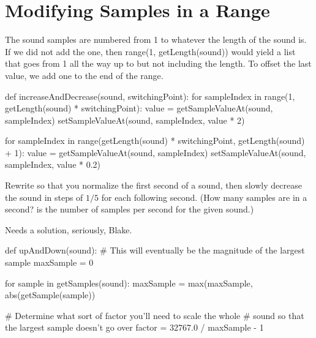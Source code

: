 
\chapter{Modifying Samples in a Range}

\begin{exercises}

\begin{ex}
The sound samples are numbered from 1 to whatever the length of the sound
is. If we did not add the one, then range(1, getLength(sound)) would yield
a list that goes from 1 all the way up to but not including the length. To
offset the last value, we add one to the end of the range.
\end{ex}

\begin{ex}
\begin{example}
def increaseAndDecrease(sound, switchingPoint):
    for sampleIndex in range(1, getLength(sound) * switchingPoint):
        value = getSampleValueAt(sound, sampleIndex)
        setSampleValueAt(sound, sampleIndex, value * 2)

    for sampleIndex in range(getLength(sound) * switchingPoint, getLength(sound) + 1):
        value = getSampleValueAt(sound, sampleIndex)
        setSampleValueAt(sound, sampleIndex, value * 0.2)
\end{example}
\end{ex}

\begin{ex}
Rewrite  so that you normalize the first second
of a sound, then slowly decrease the sound in steps of $1/5$ for
each following second.  (How many samples are in a second?
 is the number of samples per second for the
given sound.)

Needs a solution, seriously, Blake.
\end{ex}

\begin{ex}
\begin{example}
def upAndDown(sound):
    # This will eventually be the magnitude of the largest sample
    maxSample = 0 

    for sample in getSamples(sound):
        maxSample = max(maxSample, abs(getSample(sample))

    # Determine what sort of factor you'll need to scale the whole 
    # sound so that the largest sample doesn't go over
    factor = 32767.0 / maxSample - 1


\end{example}
\end{ex}
\end{exercises}
